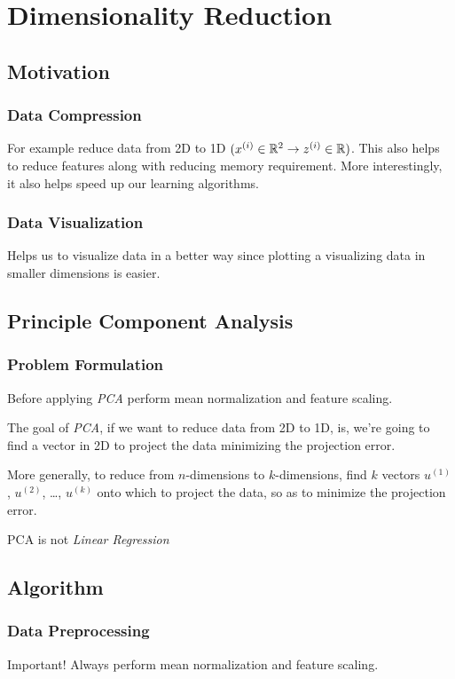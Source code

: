 \chapter{Dimensionality Reduction}
\section{Motivation}
\subsection{Data Compression}
For example reduce data from 2D to 1D $(x^{(i)} \in \mathbb{R}^2 \to z^{(i)} \in \mathbb{R})$.
This also helps to reduce features along with reducing memory requirement.
More interestingly, it also helps speed up our learning algorithms.

\subsection{Data Visualization}
Helps us to visualize data in a better way since plotting a visualizing
data in smaller dimensions is easier.

\section{Principle Component Analysis}
\subsection{Problem Formulation}
\begin{remark}
	Before applying \emph{PCA} perform mean normalization and feature scaling.
\end{remark}
The goal of \emph{PCA}, if we want to reduce data from 2D to 1D, is, we're going to
find a vector in 2D to project the data minimizing the projection error.

More generally, to reduce from $n$-dimensions to $k$-dimensions, find $k$ vectors
$u^{(1)}$, $u^{(2)}$, \dots, $u^{(k)}$ onto which to project the data, so as to
minimize the projection error.

\begin{remark}
	PCA is not \emph{Linear Regression}
\end{remark}

\section{Algorithm}
\subsection{Data Preprocessing}
Important! Always perform mean normalization and feature scaling.

